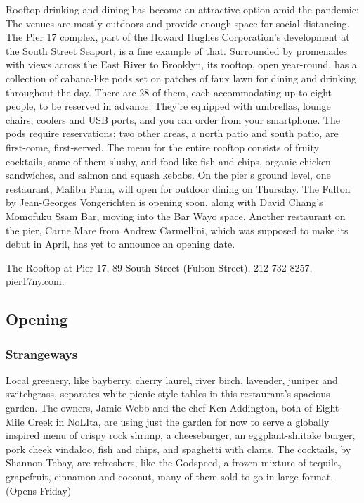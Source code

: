 Rooftop drinking and dining has become an attractive option amid the
pandemic: The venues are mostly outdoors and provide enough space for
social distancing. The Pier 17 complex, part of the Howard Hughes
Corporation's development at the South Street Seaport, is a fine example
of that. Surrounded by promenades with views across the East River to
Brooklyn, its rooftop, open year-round, has a collection of cabana-like
pods set on patches of faux lawn for dining and drinking throughout the
day. There are 28 of them, each accommodating up to eight people, to be
reserved in advance. They're equipped with umbrellas, lounge chairs,
coolers and USB ports, and you can order from your smartphone. The pods
require reservations; two other areas, a north patio and south patio,
are first-come, first-served. The menu for the entire rooftop consists
of fruity cocktails, some of them slushy, and food like fish and chips,
organic chicken sandwiches, and salmon and squash kebabs. On the pier's
ground level, one restaurant, Malibu Farm, will open for outdoor dining
on Thursday. The Fulton by Jean-Georges Vongerichten is opening soon,
along with David Chang's Momofuku Ssam Bar, moving into the Bar Wayo
space. Another restaurant on the pier, Carne Mare from Andrew
Carmellini, which was supposed to make its debut in April, has yet to
announce an opening date.

The Rooftop at Pier 17, 89 South Street (Fulton Street), 212-732-8257,
\href{https://www.pier17ny.com/}{pier17ny.com}.

\hypertarget{opening}{%
\subsection{Opening}\label{opening}}

\hypertarget{strangeways-}{%
\subsubsection{Strangeways }\label{strangeways-}}

Local greenery, like bayberry, cherry laurel, river birch, lavender,
juniper and switchgrass, separates white picnic-style tables in this
restaurant's spacious garden. The owners, Jamie Webb and the chef Ken
Addington, both of Eight Mile Creek in NoLIta, are using just the garden
for now to serve a globally inspired menu of crispy rock shrimp, a
cheeseburger, an eggplant-shiitake burger, pork cheek vindaloo, fish and
chips, and spaghetti with clams. The cocktails, by Shannon Tebay, are
refreshers, like the Godspeed, a frozen mixture of tequila, grapefruit,
cinnamon and coconut, many of them sold to go in large format. (Opens
Friday)

